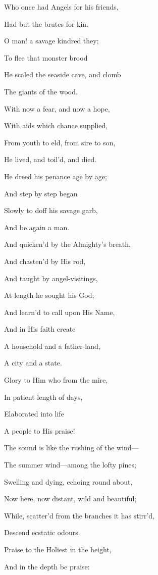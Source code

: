 Who
once had Angels for his friends,

Had but the brutes for kin.

O man! a
savage kindred they;

To flee that monster brood

He
scaled the seaside cave, and clomb

The giants of the wood.

With now
a fear, and now a hope,

With aids which chance supplied,

From
youth to eld, from sire to son,

He lived, and toil'd, and died.

He dreed
his penance age by age;

And step by step began

Slowly
to doff his savage garb,

And be again a man. 

And
quicken'd by the Almighty's breath,

And chasten'd by His rod,

And
taught by angel-visitings,

At length he sought his God;

And
learn'd to call upon His Name,

And in His faith create

A
household and a father-land,

A city and a state.

Glory to
Him who from the mire,

In patient length of days,

Elaborated into life

A people to His praise!


The sound is like the rushing of the wind—

The summer wind—among the lofty pines;

Swelling and dying, echoing round about,

Now here, now distant, wild and beautiful;

While, scatter'd from the branches it has stirr'd,

Descend ecstatic odours.


Praise to
the Holiest in the height,

And in the depth be praise:

